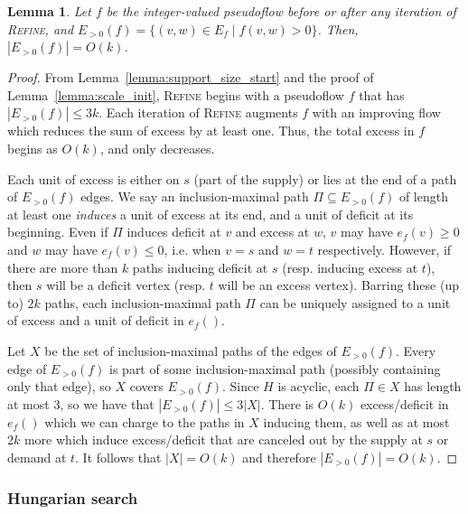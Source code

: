 \documentclass[11pt]{article}
\theoremstyle{plain}
\newtheorem{lemma}{Lemma}
\begin{document}
\begin{lemma}
\label{lemma:support_size_during}
Let $f$ be the integer-valued pseudoflow before or after any iteration of 
\textsc{Refine}, and $E_{>0}(f) = \{(v, w) \in E_f \mid f(v, w) > 0\}$.
Then, $|E_{>0}(f)| = O(k)$.
\end{lemma}

\begin{proof}
From Lemma~\ref{lemma:support_size_start} and the proof of
Lemma~\ref{lemma:scale_init}, \textsc{Refine} begins with a pseudoflow $f$ that
has $|E_{>0}(f)| \leq 3k$.
Each iteration of \textsc{Refine} augments $f$ with an improving flow which
reduces the sum of excess by at least one.
Thus, the total excess in $f$ begins as $O(k)$, and only decreases.

Each unit of excess is either on $s$ (part of the supply) or lies at the end of
a path of $E_{>0}(f)$ edges.
We say an inclusion-maximal path $\Pi \subseteq E_{>0}(f)$ of length at least
one \emph{induces} a unit of excess at its end, and a unit of deficit at its
beginning.
Even if $\Pi$ induces deficit at $v$ and excess at $w$, $v$ may have 
$e_f(v) \geq 0$ and $w$ may have $e_f(v) \leq 0$, i.e. when $v = s$ and $w = t$
respectively.
However, if there are more than $k$ paths inducing deficit at $s$ (resp. 
inducing excess at $t$), then $s$ will be a deficit vertex (resp. $t$ will be 
an excess vertex).
Barring these (up to) $2k$ paths, each inclusion-maximal path $\Pi$ can be
uniquely assigned to a unit of excess and a unit of deficit in $e_f()$.

Let $X$ be the set of inclusion-maximal paths of the edges of $E_{>0}(f)$.
Every edge of $E_{>0}(f)$ is part of some inclusion-maximal path 
(possibly containing only that edge), so $X$ covers $E_{>0}(f)$.
Since $H$ is acyclic, each $\Pi \in X$ has length at most 3, so we have that
$|E_{>0}(f)| \leq 3|X|$.
There is $O(k)$ excess/deficit in $e_f()$ which we can charge to the paths in
$X$ inducing them, as well as at most $2k$ more which induce excess/deficit
that are canceled out by the supply at $s$ or demand at $t$.
It follows that $|X| = O(k)$ and therefore $|E_{>0}(f)| = O(k)$.
\end{proof}


\subsubsection{Hungarian search}
\end{document}
